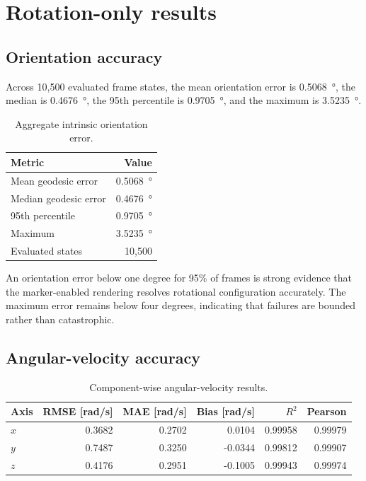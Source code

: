 \documentclass[11pt,a4paper]{article}
\begin{document}
\section{Rotation-only results}
\subsection{Orientation accuracy}
\begin{keyresult}
Across 10,500 evaluated frame states, the mean orientation error is \SI{0.5068}{\degree}, the median is \SI{0.4676}{\degree}, the 95th percentile is \SI{0.9705}{\degree}, and the maximum is \SI{3.5235}{\degree}.
\end{keyresult}

\begin{table}[H]
\centering
\caption{Aggregate intrinsic orientation error.}
\begin{tabular}{lr}
\toprule
Metric & Value\\
\midrule
Mean geodesic error & \SI{0.5068}{\degree}\\
Median geodesic error & \SI{0.4676}{\degree}\\
95th percentile & \SI{0.9705}{\degree}\\
Maximum & \SI{3.5235}{\degree}\\
Evaluated states & 10,500\\
\bottomrule
\end{tabular}
\end{table}

An orientation error below one degree for 95\% of frames is strong evidence that the marker-enabled rendering resolves rotational configuration accurately. The maximum error remains below four degrees, indicating that failures are bounded rather than catastrophic.

\subsection{Angular-velocity accuracy}
\begin{table}[H]
\centering
\caption{Component-wise angular-velocity results.}
\begin{tabular}{lrrrrr}
\toprule
Axis & RMSE [rad/s] & MAE [rad/s] & Bias [rad/s] & $R^2$ & Pearson\\
\midrule
$x$ & 0.3682 & 0.2702 & 0.0104 & 0.99958 & 0.99979\\
$y$ & 0.7487 & 0.3250 & -0.0344 & 0.99812 & 0.99907\\
$z$ & 0.4176 & 0.2951 & -0.1005 & 0.99943 & 0.99974\\
\bottomrule
\end{tabular}
\end{table}
\end{document}
